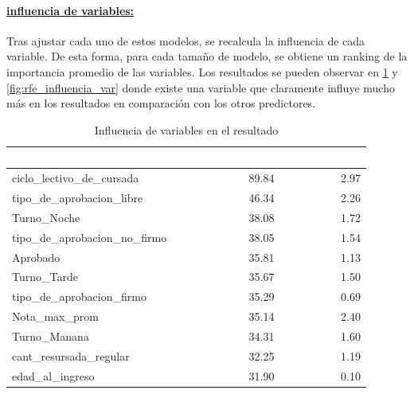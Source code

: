 \paragraph{\underline{influencia de variables:}}
Tras ajustar cada uno de estos modelos, se recalcula la influencia de cada variable. De esta forma, para cada tamaño de modelo, se obtiene un ranking de la importancia promedio de las variables. Los resultados se pueden observar en \ref{tab:tf_rfe_influencia_variables} y \ref{fig:rfe_influencia_var} donde existe una variable que claramente influye mucho más en los resultados en comparación con los otros predictores.

\begin{table}[!h]
	
	\caption{\label{tab:tf_rfe_influencia_variables}Influencia de variables en el resultado}
	\centering
	\begin{tabular}[t]{lrr}
		\toprule
		\rowcolor{black}  \multicolumn{1}{c}{\textcolor{white}{\textbf{var}}} & \multicolumn{1}{c}{\textcolor{white}{\textbf{media\_influencia}}} & \multicolumn{1}{c}{\textcolor{white}{\textbf{sd\_influencia}}}\\
		\midrule
		\rowcolor{gray!6}  ciclo\_lectivo\_de\_cursada & 89.84 & 2.97\\
		tipo\_de\_aprobacion\_libre & 46.34 & 2.26\\
		\rowcolor{gray!6}  Turno\_Noche & 38.08 & 1.72\\
		tipo\_de\_aprobacion\_no\_firmo & 38.05 & 1.54\\
		\rowcolor{gray!6}  Aprobado & 35.81 & 1.13\\
		\addlinespace
		Turno\_Tarde & 35.67 & 1.50\\
		\rowcolor{gray!6}  tipo\_de\_aprobacion\_firmo & 35.29 & 0.69\\
		Nota\_max\_prom & 35.14 & 2.40\\
		\rowcolor{gray!6}  Turno\_Manana & 34.31 & 1.60\\
		cant\_resursada\_regular & 32.25 & 1.19\\
		\addlinespace
		\rowcolor{gray!6}  edad\_al\_ingreso & 31.90 & 0.10\\
		\bottomrule
	\end{tabular}
\end{table}

